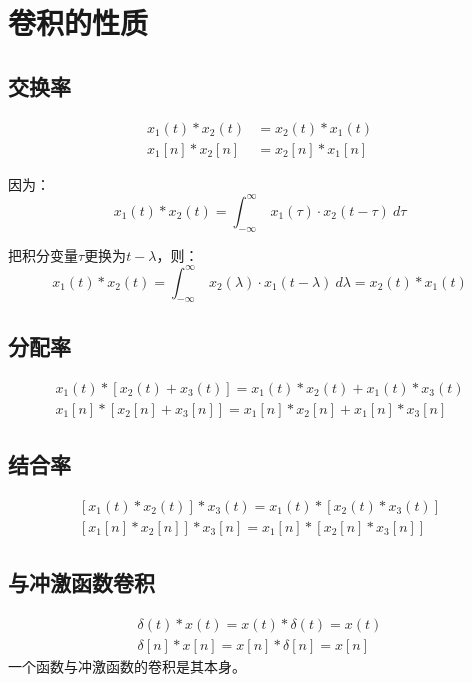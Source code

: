 \section{卷积的性质}
\subsection{交换率}
\begin{align*}
	x_1(t)*x_2(t) & =x_2(t)*x_1(t) \\
	x_1[n]*x_2[n] & =x_2[n]*x_1[n]
\end{align*}

因为：
\begin{equation}
	x_1(t)*x_2(t)=\int_{-\infty}^\infty\ x_1(\tau)\cdot x_2(t-\tau)\ d\tau
\end{equation}

把积分变量$\tau$更换为$t-\lambda$，则：
\begin{equation}
	x_1(t)*x_2(t)=\int_{-\infty}^\infty\ x_2(\lambda)\cdot x_1(t-\lambda)\ d\lambda=x_2(t)*x_1(t)
\end{equation}
\subsection{分配率}
\begin{align*}
	x_1(t)*[x_2(t)+x_3(t)]=x_1(t)*x_2(t)+x_1(t)*x_3(t) \\
	x_1[n]*[x_2[n]+x_3[n]]=x_1[n]*x_2[n]+x_1[n]*x_3[n]
\end{align*}
\subsection{结合率}
\begin{align*}
	\left[x_{1}(t)*x_{2}(t)\right]*x_{3}(t)=x_{1}(t)*\left[x_{2}(t)*x_{3}(t)\right] \\
	\left[x_{1}[n]*x_{2}[n]\right]*x_{3}[n]=x_{1}[n]*\left[x_{2}[n]*x_{3}[n]\right]
\end{align*}
\subsection{与冲激函数卷积}
\begin{align*}
	\delta(t)*x(t)=x(t)*\delta(t)=x(t) \\
	\delta[n]*x[n]=x[n]*\delta[n]=x[n]
\end{align*}
一个函数与冲激函数的卷积是其本身。
